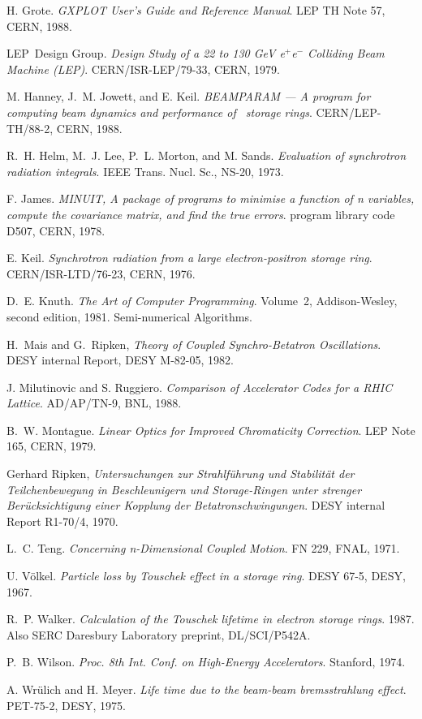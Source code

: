 \begin{thebibliography}{10}
H. Grote.
{\sl GXPLOT User's Guide and Reference Manual}.
LEP TH Note 57, CERN, 1988.
 
LEP~Design Group.
{\sl Design Study of a 22 to 130 GeV e\({}^{+}\)e\({}^{-}\) Colliding Beam
  Machine (LEP)}.
CERN/ISR-LEP/79-33, CERN, 1979.
 
M. Hanney, J.~M. Jowett, and E. Keil.
{\sl BEAMPARAM --- A program for computing beam dynamics and
  performance of \epem\ storage rings}.
CERN/LEP-TH/88-2, CERN, 1988.
 
R.~H. Helm, M.~J. Lee, P.~L. Morton, and M. Sands.
{\sl Evaluation of synchrotron radiation integrals}.
IEEE Trans. Nucl. Sc., NS-20, 1973.
 
F. James.
{\sl MINUIT, A package of programs to minimise a function of n
  variables, compute the covariance matrix, and find the true errors}.
program library code D507, CERN, 1978.
 
E. Keil.
{\sl Synchrotron radiation from a large electron-positron storage ring}.
CERN/ISR-LTD/76-23, CERN, 1976.
 
D.~E. Knuth.
{\sl The Art of Computer Programming}.
Volume~2, Addison-Wesley, second edition, 1981.
Semi-numerical Algorithms.
 
H.~Mais and G.~Ripken,
{\sl Theory of Coupled Synchro-Betatron Oscillations}.
DESY internal Report, DESY M-82-05, 1982.
 
J. Milutinovic and S. Ruggiero.
{\sl Comparison of Accelerator Codes for a RHIC Lattice}.
AD/AP/TN-9, BNL, 1988.
 
B.~W. Montague.
{\sl Linear Optics for Improved Chromaticity Correction}.
LEP Note 165, CERN, 1979.
 
Gerhard Ripken,
{\sl Untersuchungen zur Strahlf\"uhrung und Stabilit\"at der
Teilchenbewegung in Beschleunigern und Storage-Ringen unter strenger
Ber\"ucksichtigung einer Kopplung der Betatronschwingungen}.
DESY internal Report R1-70/4, 1970.
 
L.~C. Teng.
{\sl Concerning n-Dimensional Coupled Motion}.
FN 229, FNAL, 1971.
 
U. V\"olkel.
{\sl Particle loss by Touschek effect in a storage ring}.
DESY 67-5, DESY, 1967.
 
R.~P. Walker.
{\sl Calculation of the Touschek lifetime in electron storage rings}.
1987.
Also SERC Daresbury Laboratory preprint, DL/SCI/P542A.
 
P.~B. Wilson.
{\sl Proc. 8th Int. Conf. on High-Energy Accelerators}.
Stanford, 1974.
 
A. Wr\"ulich and H. Meyer.
{\sl Life time due to the beam-beam bremsstrahlung effect}.
PET-75-2, DESY, 1975.
 
\end{thebibliography}
 
\printindex
 

